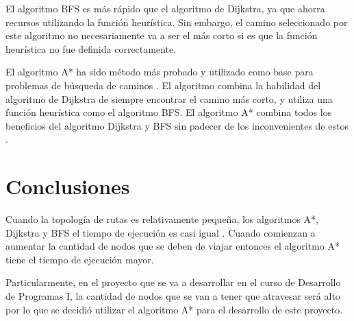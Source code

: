 \documentclass{article}
\begin{document}
El algoritmo BFS es más rápido que el algoritmo de Dijkstra, ya que ahorra recursos
utilizando la función heurística. Sin embargo, el camino seleccionado por este
algoritmo no necesariamente va a ser el más corto si es que la función heurística
no fue definida correctamente.

El algoritmo A* ha sido método más probado y utilizado como base para problemas
de búsqueda de caminos \autocite{foead}. El algoritmo combina la habilidad del
algoritmo de Dijkstra de siempre encontrar el camino más corto, y utiliza una
función heurística como el algoritmo BFS. El algoritmo A* combina todos los
beneficios del algoritmo Dijkstra y BFS sin padecer de los inconvenientes
de estos \autocite{mehta}.

\section{Conclusiones}
Cuando la topología de rutas es relativamente pequeña, los algoritmos A*, Dijkstra
y BFS el tiempo de ejecución es casi igual \autocite{minhang}. Cuando comienzan
a aumentar la cantidad de nodos que se deben de viajar entonces el algoritmo A*
tiene el tiempo de ejecución mayor.

Particularmente, en el proyecto que se va a desarrollar en el curso de Desarrollo
de Programas I, la cantidad de nodos que se van a tener que atravesar será alto
por lo que se decidió utilizar el algoritmo A* para el desarrollo de este proyecto.

\printbibliography{}
\end{document}
